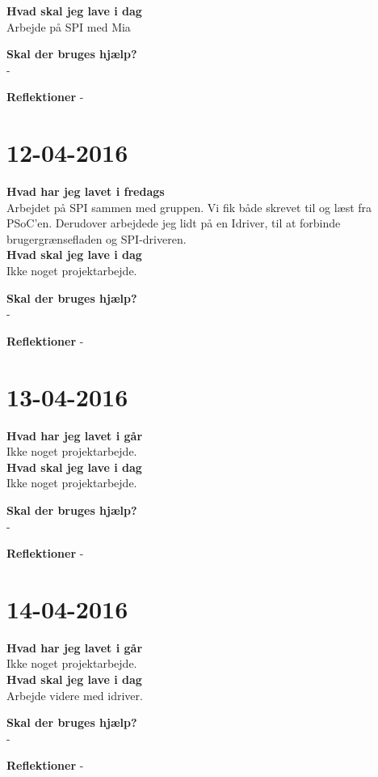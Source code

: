 \documentclass{article}
\begin{document}
	\textbf{Hvad skal jeg lave i dag}\\
	Arbejde på SPI med Mia
	
	\textbf{Skal der bruges hjælp?}\\
	-
	
	\textbf{Reflektioner}
	-
	
	

	\section{12-04-2016}
	
	\textbf{Hvad har jeg lavet i fredags}\\
	Arbejdet på SPI sammen med gruppen. Vi fik både skrevet til og læst fra PSoC'en. Derudover arbejdede jeg lidt på en Idriver, til at forbinde brugergrænsefladen og SPI-driveren.\\
	
	\textbf{Hvad skal jeg lave i dag}\\
	Ikke noget projektarbejde.
	
	\textbf{Skal der bruges hjælp?}\\
	-
	
	\textbf{Reflektioner}
	-
	
	
	
	\section{13-04-2016}
	
	\textbf{Hvad har jeg lavet i går}\\
	Ikke noget projektarbejde.\\
	
	\textbf{Hvad skal jeg lave i dag}\\
	Ikke noget projektarbejde.
	
	\textbf{Skal der bruges hjælp?}\\
	-
	
	\textbf{Reflektioner}
	-
	
	
	
	\section{14-04-2016}
	
	\textbf{Hvad har jeg lavet i går}\\
	Ikke noget projektarbejde.\\
	
	\textbf{Hvad skal jeg lave i dag}\\
	Arbejde videre med idriver.
	
	\textbf{Skal der bruges hjælp?}\\
	-
	
	\textbf{Reflektioner}
	-
	
\end{document}
